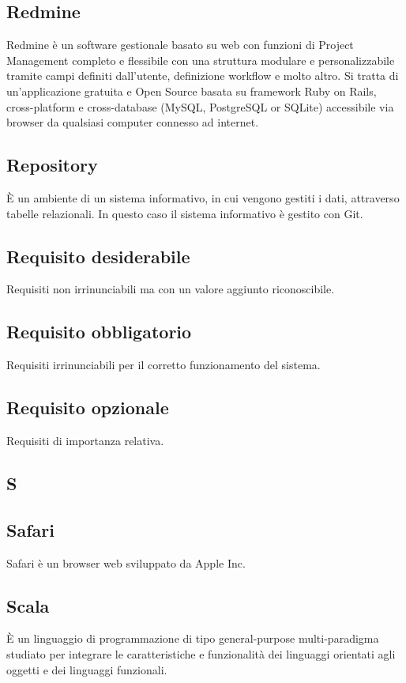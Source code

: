 \subsection{Redmine}
Redmine è un software gestionale basato su web con funzioni di Project Management completo e flessibile con una struttura modulare e personalizzabile tramite campi definiti dall'utente, definizione workflow e molto altro.
Si tratta di un'applicazione gratuita e Open Source basata su framework Ruby on Rails, cross-platform e cross-database (MySQL, PostgreSQL or SQLite) accessibile via browser da qualsiasi computer connesso ad internet.

\subsection{Repository}
È un ambiente di un sistema informativo, in cui vengono gestiti i dati, attraverso
tabelle relazionali. In questo caso il sistema informativo è gestito con Git.

\subsection{Requisito desiderabile}
Requisiti non irrinunciabili ma con un valore aggiunto riconoscibile.

\subsection{Requisito obbligatorio}
Requisiti irrinunciabili per il corretto funzionamento del sistema.

\subsection{Requisito opzionale}
Requisiti di importanza relativa.

\newpage

\begin{center}
\Huge\section{\uppercase{S}}
\end{center}

\subsection{Safari}
Safari è un browser web sviluppato da Apple Inc. 

\subsection{Scala}
È un linguaggio di programmazione di tipo general-purpose multi-paradigma studiato per integrare le caratteristiche e funzionalità dei linguaggi orientati agli oggetti e dei linguaggi funzionali.

